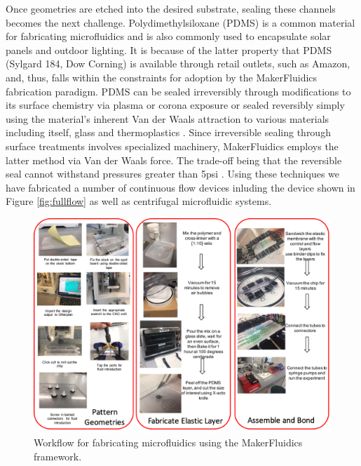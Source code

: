 Once geometries are etched into the desired substrate, sealing these channels becomes the next challenge. Polydimethylsiloxane (PDMS) is a common material for fabricating microfluidics \cite{mcdonald2002poly} and is also commonly used to encapsulate solar panels and outdoor lighting. It is because of the latter property that PDMS (Sylgard 184, Dow Corning) is available through retail outlets, such as Amazon, and, thus, falls within the constraints for adoption by the MakerFluidics fabrication paradigm. PDMS can be sealed irreversibly through modifications to its surface chemistry via plasma or corona exposure or sealed reversibly simply using the material's inherent Van der Waals attraction to various materials including itself, glass and thermoplastics \cite{mcdonald2002poly}. Since irreversible sealing through surface treatments involves specialized machinery, MakerFluidics employs the latter method via Van der Waals force. The trade-off being that the reversible seal cannot withstand pressures greater than 5psi \cite{mcdonald2002poly}. Using these techniques we have fabricated a number of continuous flow devices inluding the device shown in Figure \ref{fig:fullflow} as well as centrifugal microfluidic systems.

\begin{figure}[h]
  \begin{minipage}[t]{0.99\linewidth}\centering
    \includegraphics[width=14cm]{fabFlow.pdf}
    \medskip
  \end{minipage}\hfill
  \caption[MakerFluidics Fabrication Protocol]{Workflow for fabricating microfluidics using the MakerFluidics framework.}
    \label{fig:fabFlow}
\end{figure}


